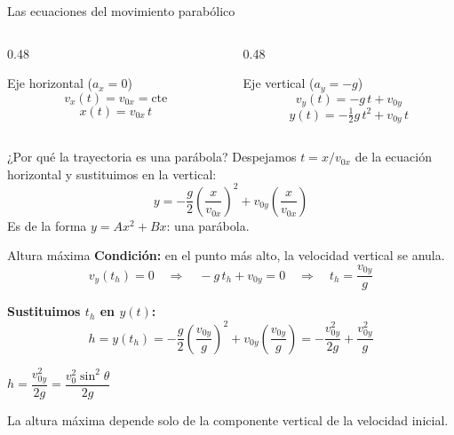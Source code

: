 \documentclass[aspectratio=169,xcolor=dvipsnames]{beamer}
\begin{document}
	\begin{frame}{Las ecuaciones del movimiento parabólico}
		\begin{columns}[T]
			\begin{column}{0.48\textwidth}
				\begin{block}{Eje horizontal ($a_x = 0$)}
					\[
					v_x(t) = v_{0x} = \text{cte}
					\]
					\[
					x(t) = v_{0x}\,t
					\]
				\end{block}
			\end{column}
			\begin{column}{0.48\textwidth}
				\begin{block}{Eje vertical ($a_y = -g$)}
					\[
					v_y(t) = -g\,t + v_{0y}
					\]
					\[
					y(t) = -\tfrac{1}{2}g\,t^2 + v_{0y}\,t
					\]
				\end{block}
			\end{column}
		\end{columns}
		
		\vspace{0.35cm}
		\begin{exampleblock}{¿Por qué la trayectoria es una parábola?}
			Despejamos $t = x/v_{0x}$ de la ecuación horizontal y sustituimos en la vertical:
			\[
			y = -\frac{g}{2}\left(\frac{x}{v_{0x}}\right)^{2} + v_{0y}\left(\frac{x}{v_{0x}}\right)
			\]
			\centering
			\small Es de la forma $y = Ax^2 + Bx$: una parábola.
		\end{exampleblock}
	\end{frame}
	
	\begin{frame}{Altura máxima}
		\normalsize
		\textbf{Condición:} en el punto más alto, la velocidad vertical se anula.
		\[
		v_y(t_h) = 0 \quad\Longrightarrow\quad -g\,t_h + v_{0y} = 0
		\quad\Longrightarrow\quad t_h = \frac{v_{0y}}{g}
		\]
		
		\vspace{0.15cm}
		\textbf{Sustituimos $t_h$ en $y(t)$:}
		\[
		h = y(t_h) = -\frac{g}{2}\left(\frac{v_{0y}}{g}\right)^{2} + v_{0y}\left(\frac{v_{0y}}{g}\right)
		= -\frac{v_{0y}^{2}}{2g} + \frac{v_{0y}^{2}}{g}
		\]
		
		\vspace{0.1cm}
		\begin{exampleblock}{}
			\centering
			\Large $h = \dfrac{v_{0y}^{2}}{2g} = \dfrac{v_{0}^{2}\sin^{2}\theta}{2g}$
		\end{exampleblock}
		
		\vspace{0.1cm}
		\begin{center}
			\normalsize La altura máxima depende solo de la componente vertical de la velocidad inicial.
		\end{center}
	\end{frame}
	
\end{document}
